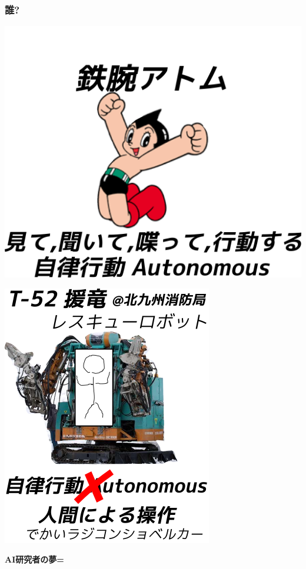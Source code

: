 \subsubsection{誰?}
\label{sec:orgheadline6}

\begin{container-fluid}
\begin{row-fluid}
\begin{span6}
\includegraphics{img/astro/final.png}
\end{span6}
\begin{span6}
\includegraphics{img/rescue/final.png}
\end{span6}
\end{row-fluid}
\begin{row-fluid}
\begin{span12}
\begin{xlarge}
\textbf{AI研究者の夢=}
\end{xlarge}
\end{span12}
\end{row-fluid}
\end{container-fluid}

